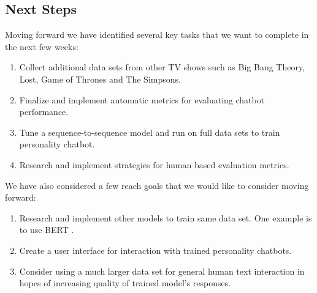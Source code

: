 \documentclass{article}
\begin{document}
\subsection*{Next Steps}
Moving forward we have identified several key tasks that we want to complete in the next few weeks:
\begin{enumerate}
	\item Collect additional data sets from other TV shows such as Big Bang Theory, Lost, Game of Thrones and The Simpsons.
	\item Finalize and implement automatic metrics for evaluating chatbot performance.
	\item Tune a sequence-to-sequence model and run on full data sets to train personality chatbot.
	\item Research and implement strategies for human based evaluation metrics.
\end{enumerate}
We have also considered a few reach goals that we would like to consider moving forward:
\begin{enumerate}
	\item Research and implement other models to train same data set. One example is to use BERT \cite{Devlin2018}.
	\item Create a user interface for interaction with trained personality chatbots.
	\item Consider using a much larger data set for general human text interaction in hopes of increasing quality of trained model's responses.
\end{enumerate}



\end{document}
